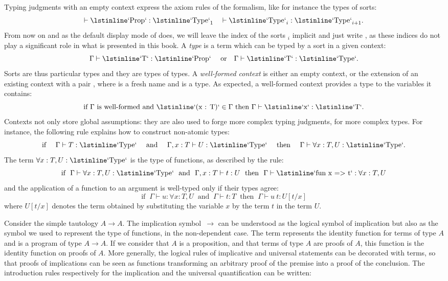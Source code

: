 Typing judgments with an empty context express the
axiom rules of the formalism, like for instance the types of sorts:
$$\vdash \C{Prop} : \C{Type}_1 \quad \vdash \C{Type}_i : \C{Type}_{i+1}.$$
From now on and as the default display mode of \Coq{} does, we will leave
the index of the sorts $_i$ implicit and just write ,
as these indices do not play a significant role in what is presented
in this book. A \emph{type} is a term which can be typed by a sort in
a given context:
$$\Gamma \vdash \C{T} : \C{Prop} \quad \textrm{ or}
\quad \Gamma \vdash \C{T} : \C{Type}.$$
Sorts are thus particular types and they are types of types.
A \emph{well-formed context} is either an empty context, or the
extension of an existing context with a pair , where 
is a fresh name and  is a type. As expected, a well-formed
context provides a type to the variables it contains:
$$\textrm{if } \Gamma \textrm{ is well-formed  and }
\C{(x : T)} \in \Gamma \textrm{ then }
\Gamma \vdash \C{x} : \C{T}.$$
Contexts not only store global assumptions: they are also used to
forge more complex typing judgments, for more complex types. For
instance, the following rule explains how to construct non-atomic
types:
$$\textrm{if }\quad \Gamma \vdash T : \C{Type} \quad\textrm{ and }\quad
\Gamma, x : T \vdash U : \C{Type} \quad\textrm{ then }\quad
\Gamma \vdash \forall x : T, U : \C{Type}.$$
The term $ \forall x : T, U : \C{Type}$ is the type of functions, as
described by the rule:
$$\textrm{if } \ \Gamma \vdash \forall x : T, U : \C{Type}
\ \textrm{ and }\
\Gamma, x : T \vdash t : U
\ \textrm{ then }\
\Gamma \vdash \C{fun x => t} : \forall x : T, U
$$
and the application of a function to an argument is well-typed only if
their types agree:
$$\textrm{if } \ \Gamma \vdash u : \forall x : T, U
\ \textrm{ and }\
\Gamma \vdash t : T
\ \textrm{ then }\
\Gamma \vdash u\ t : U[t/x]
$$
where $U[t/x]$ denotes the term obtained by substituting
the variable $x$ by the term $t$ in the term $U$.

Consider the simple tautology $A \rightarrow A$.
The implication symbol~$\to$ can be understood as the logical symbol
of implication but also as the symbol we used
to represent the type of functions, in the non-dependent case. The
term \C{(fun x : A => x)} represents the identity function for terms
of type $A$ and is a program of type $A \rightarrow A$. If we consider
that $A$ is a proposition, and that terms of type $A$ are proofs of
$A$, this function is the identity function on proofs of $A$.
More generally, the logical rules of implicative and universal
statements can be decorated with terms, so that proofs of implications
can be seen as functions transforming an arbitrary proof of the
premise into a proof of the conclusion. The introduction rules
respectively for the implication and the universal quantification can
be written:

